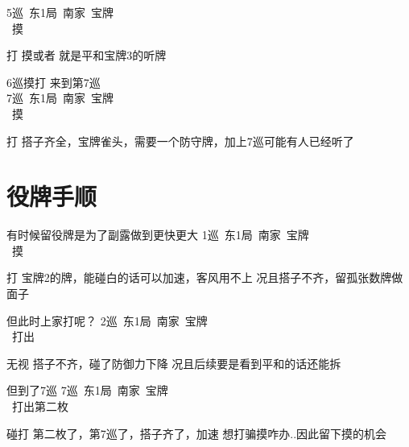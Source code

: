 \documentclass[小V的日麻笔记.tex]{subfiles}
\begin{document}
5巡\ 东1局\ 南家\ 宝牌\\
\ 摸 \\
\begin{itemize}
\arrowitem 打
\arrowitem 摸或者 就是平和宝牌3的听牌
\end{itemize}

6巡摸打 来到第7巡 \\
7巡\ 东1局\ 南家\ 宝牌\\
\ 摸 \\
\begin{itemize}
\arrowitem 打
\arrowitem 搭子齐全，宝牌雀头，需要一个防守牌，加上7巡可能有人已经听了
\end{itemize}

\section{役牌手顺}
有时候留役牌是为了副露做到更快更大
1巡\ 东1局\ 南家\ 宝牌\\
\ 摸 \\
\begin{itemize}
\arrowitem 打
\arrowitem 宝牌2的牌，能碰白的话可以加速，客风用不上
\arrowitem 况且搭子不齐，留孤张数牌做面子
\end{itemize}

但此时上家打呢？
2巡\ 东1局\ 南家\ 宝牌\\
\ 打出 \\
\begin{itemize}
\arrowitem 无视
\arrowitem 搭子不齐，碰了防御力下降
\arrowitem 况且后续要是看到平和的话还能拆
\end{itemize}

但到了7巡
7巡\ 东1局\ 南家\ 宝牌\\
\ 打出第二枚 \\
\begin{itemize}
\arrowitem 碰打
\arrowitem 第二枚了，第7巡了，搭子齐了，加速
\arrowitem 想打骗摸咋办..因此留下摸的机会
\end{itemize}
\end{document}
